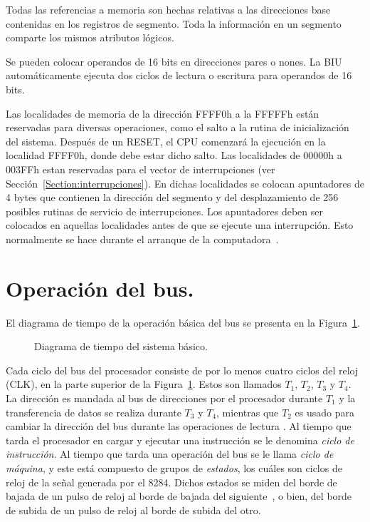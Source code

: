 Todas las referencias a memoria son hechas relativas a las direcciones base contenidas en los %
registros de segmento. Toda la informaci\'on en un segmento comparte los mismos atributos %
l\'ogicos. 

Se pueden colocar operandos de 16 bits en direcciones pares o nones. La BIU autom\'aticamente %
ejecuta dos ciclos de lectura o escritura para operandos de 16 bits.

Las localidades de memoria de la direcci\'on FFFF0h a la FFFFFh es\-t\'an reservadas para %
diversas operaciones, como el salto a la rutina de inicializaci\'on del sistema. Despu\'es de %
un RESET, el CPU comenzar\'a la ejecuci\'on en la localidad FFFF0h, donde debe estar dicho %
salto. Las localidades de 00000h a 003FFh estan reservadas para el vector de interrupciones (ver %
Secci\'on~\ref{Section:interrupciones}). En dichas localidades se colocan apuntadores de 4 %
bytes que contienen la direcci\'on del segmento y del desplazamiento de 256 posibles rutinas de %
servicio de interrupciones. Los apuntadores deben ser colocados en aquellas localidades antes de %
que se ejecute una in\-te\-rrup\-ci\-\'on. Esto normalmente se hace durante el arranque de la %
computadora~\cite{Godfrey}.


\section{Operaci\'on del bus.}
\label{Seccion:bus}

El diagrama de tiempo de la operaci\'on b\'asica del bus se presenta en la %
Figura~\ref{diagtiempobasico}. 

\begin{figure}[!hbt]
\vskip 5mm
\vskip 78mm
\caption{Diagrama de tiempo del sistema b\'asico.} 
\label{diagtiempobasico}
\end{figure}

Cada ciclo del bus del procesador consiste de por lo menos cuatro ciclos del reloj (CLK), en la %
parte superior de la Figura~\ref{diagtiempobasico}. Estos son llamados $T_{1}$, $T_{2}$, %
$T_{3}$ y $T_{4}$. La direcci\'on es mandada al bus de direcciones por el procesador durante %
$T_{1}$ y la transferencia de datos se realiza durante $T_{3}$ y $T_{4}$, mientras que %
$T_{2}$ es usado para cambiar la direcci\'on del bus durante las operaciones de lectura %
\cite{Intel:Micro}. Al tiempo que tarda el procesador en cargar y ejecutar una instrucci\'on %
se le denomina {\em ciclo de instrucci\'on\/}. Al tiempo que tarda una operaci\'on del bus se %
le llama {\em ciclo de m\'aquina}, y este est\'a compuesto de grupos de {\em estados}, los %
cu\'ales son ciclos de reloj de la se\~nal generada por el 8284. Dichos estados se miden del %
borde de bajada de un pulso de reloj al borde de bajada del siguiente~\cite{Hall}, o bien, del %
borde de subida de un pulso de reloj al borde de subida del otro.

